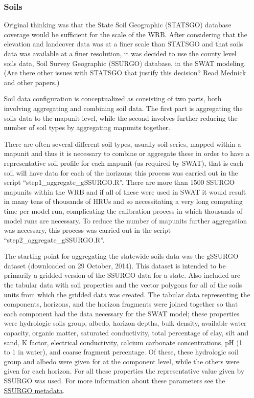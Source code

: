\subsubsection{Soils}
Original thinking was that the State Soil Geographic (STATSGO) database coverage would be sufficient for the scale of the WRB. After considering that the elevation and landcover data was at a finer scale than STATSGO and that soils data was available at a finer resolution, it was decided to use the county level soils data, Soil Survey Geographic (SSURGO) database, in the SWAT modeling. (Are there other issues with STATSGO that justify this decision? Read Mednick and other papers.)  		

Soil data configuration is conceptualized as consisting of two parts, both involving aggregating and combining soil data. The first part is aggregating the soils data to the mapunit level, while the second involves further reducing the number of soil types by aggregating mapunits together.		

There are often several different soil types, usually soil series, mapped within a mapunit and thus it is necessary to combine or aggregate these in order to have a representative soil profile for each mapunit (as required by SWAT), that is each soil will have data for each of the horizons; this process was carried out in the script ``step1\_aggregate\_gSSURGO.R''. There are more than 1500 SSURGO mapunits within the WRB and if all of these were used in SWAT it would result in many tens of thousands of HRUs and so necessitating a very long computing time per model run, complicating the calibration process in which thousands of model runs are necessary. To reduce the number of mapunits further aggregation was necessary, this process was carried out in the script ``step2\_aggregate\_gSSURGO.R''.
 
The starting point for aggregating the statewide soils data was the gSSURGO dataset (downloaded on 29 October, 2014). This dataset is intended to be primarily a gridded version of the SSURGO data for a state. Also included are the tabular data with soil properties and the vector polygons for all of the soils units from which the gridded data was created. The tabular data representing the components, horizons, and the horizon fragments were joined together so that each component had the data necessary for the SWAT model; these properties were hydrologic soils group, albedo, horizon depths, bulk density, available water capacity, organic matter, saturated conductivity, total percentage of clay, silt and sand, K factor, electrical conductivity, calcium carbonate concentrations, pH (1 to 1 in water), and coarse fragment percentage. Of these, these hydrologic soil group and albedo were given for at the component level, while the others were given for each horizon.  For all these properties the representative value given by SSURGO was used. For more information about these parameters see the \href{http://www.nrcs.usda.gov/wps/portal/nrcs/detail/soils/survey/?cid=nrcs142p2_053631}{SSURGO metadata}. 

